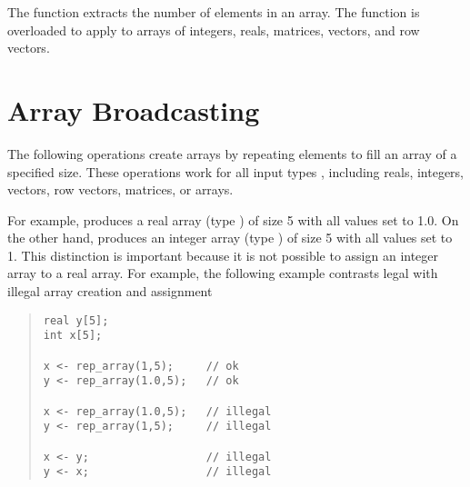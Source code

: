 The  function extracts the number of elements in an
array.  The function is overloaded to apply to arrays of integers,
reals, matrices, vectors, and row vectors.

\begin{description}
%
\end{description}


\section{Array Broadcasting}\label{array-broadcasting.section}

The following operations create arrays by repeating elements to fill
an array of a specified size.  These operations work for all input
types , including reals, integers, vectors, row vectors,
matrices, or arrays.
%
\begin{description}
%
%
\end{description}
%
For example,  produces a real array (type
) of size 5 with all values set to 1.0.  On the other
hand,  produces an integer array (type
) of size 5 with all values set to 1.  This distinction is
important because it is not possible to assign an integer array to a
real array.  For example, the following example contrasts legal with
illegal array creation and assignment
%
\begin{quote}
\begin{Verbatim}[fontsize=\small]
real y[5];
int x[5];

x <- rep_array(1,5);     // ok
y <- rep_array(1.0,5);   // ok

x <- rep_array(1.0,5);   // illegal 
y <- rep_array(1,5);     // illegal

x <- y;                  // illegal
y <- x;                  // illegal
\end{Verbatim}
\end{quote}

